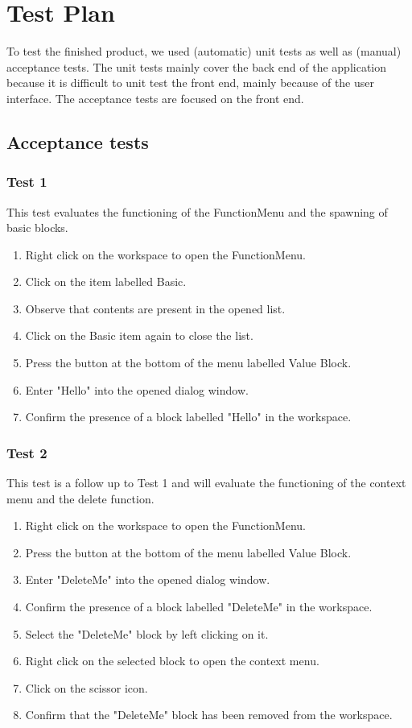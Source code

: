 \chapter{Test Plan}

To test the finished product, we used (automatic) unit tests as well as (manual) acceptance tests.
The unit tests mainly cover the back end of the application because it is difficult to unit test the front end, mainly because of the user interface.
The acceptance tests are focused on the front end.

\section{Acceptance tests} \label{acceptance tests}
	\subsection{Test 1}
		This test evaluates the functioning of the FunctionMenu and the spawning of basic blocks.
		
		\begin{enumerate}
			\item Right click on the workspace to open the FunctionMenu.
			\item Click on the item labelled Basic.
			\item Observe that contents are present in the opened list.
			\item Click on the Basic item again to close the list.
			\item Press the button at the bottom of the menu labelled Value Block.
			\item Enter "Hello" into the opened dialog window.
			\item Confirm the presence of a block labelled "Hello" in the workspace.
		\end{enumerate}
		
	\subsection{Test 2}
		This test is a follow up to Test 1 and will evaluate the functioning of the context menu
		and the delete function.
		
		\begin{enumerate}
			\item Right click on the workspace to open the FunctionMenu.
			\item Press the button at the bottom of the menu labelled Value Block.
			\item Enter "DeleteMe" into the opened dialog window.
			\item Confirm the presence of a block labelled "DeleteMe" in the workspace.
			\item Select the "DeleteMe" block by left clicking on it.
			\item Right click on the selected block to open the context menu.
			\item Click on the scissor icon.
			\item Confirm that the "DeleteMe" block has been removed from the workspace.
		\end{enumerate}
		

